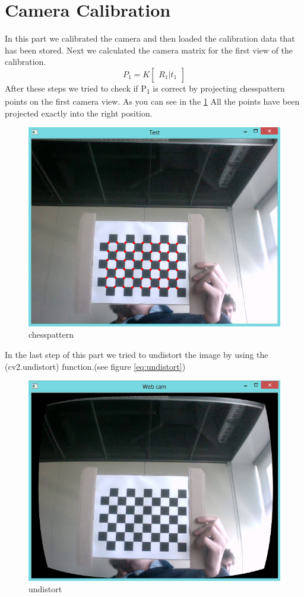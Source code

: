 \section{Camera Calibration}
In this part we calibrated the camera and then loaded the calibration data that has been stored. Next we calculated the camera matrix for the first view of the calibration.
\begin{equation}
  P_{1} = K
	\begin{bmatrix} R_{1}|t_{1} \end{bmatrix}
\end{equation}
 After these steps we tried to check if P\textsubscript{1} is correct by projecting chesspattern points on the first camera view. As you can see in the \ref{fig:chesspattern} All the points have been projected exactly into the right position.
 
 \begin{figure}[h!]
	\centering
	\includegraphics[width=\textwidth]{Handin3/images/patterndot.jpg}
	\caption{chesspattern}
	\label{fig:chesspattern}
\end{figure}
 
 In the last step of this part we tried to undistort the image by using the (cv2.undistort) function.(see figure \ref{eq:undistort})
 
 \begin{figure}[h!]
	\centering
	\includegraphics[width=\textwidth]{Handin3/images/undistort.jpg}
	\caption{undistort}
	\label{fig:undistort}
\end{figure}
 
